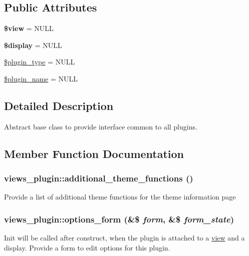 \subsection*{Public Attributes}
\begin{DoxyCompactItemize}
\item 
\hypertarget{classviews__plugin_ac62554d97ccc70fce76ea68b215957bb}{
{\bfseries \$view} = NULL}
\label{classviews__plugin_ac62554d97ccc70fce76ea68b215957bb}

\item 
\hypertarget{classviews__plugin_ae1fac89c722a33797cc05ef14533723c}{
{\bfseries \$display} = NULL}
\label{classviews__plugin_ae1fac89c722a33797cc05ef14533723c}

\item 
\hyperlink{classviews__plugin_aac8d238d0a27a1bbafe4c388d8138b33}{\$plugin\_\-type} = NULL
\item 
\hyperlink{classviews__plugin_a7db77a3a04654e3dbd555980375bcd6d}{\$plugin\_\-name} = NULL
\end{DoxyCompactItemize}


\subsection{Detailed Description}
Abstract base class to provide interface common to all plugins. 

\subsection{Member Function Documentation}
\hypertarget{classviews__plugin_a5c5fb9783079362378d804c94b142b9f}{
\subsubsection[{additional\_\-theme\_\-functions}]{\setlength{\rightskip}{0pt plus 5cm}views\_\-plugin::additional\_\-theme\_\-functions ()}}
\label{classviews__plugin_a5c5fb9783079362378d804c94b142b9f}
Provide a list of additional theme functions for the theme information page \hypertarget{classviews__plugin_a1aaed8da1afd9f45293a37358c159837}{
\subsubsection[{options\_\-form}]{\setlength{\rightskip}{0pt plus 5cm}views\_\-plugin::options\_\-form (\&\$ {\em form}, \/  \&\$ {\em form\_\-state})}}
\label{classviews__plugin_a1aaed8da1afd9f45293a37358c159837}
Init will be called after construct, when the plugin is attached to a \hyperlink{classview}{view} and a display. Provide a form to edit options for this plugin. 

